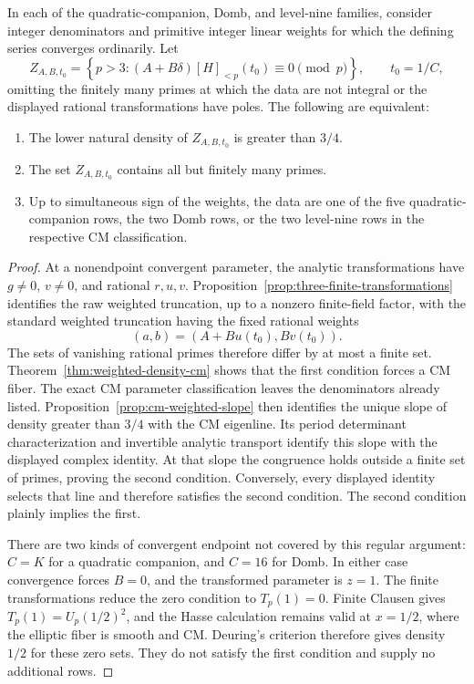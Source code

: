 \begin{theorem}
\label{thm:additional-raw-density}
In each of the quadratic-companion, Domb, and level-nine families,
consider integer denominators and primitive integer linear weights
for which the defining series converges ordinarily.  Let
\[
 Z_{A,B,t_0}=
 \left\{p>3:(A+B\delta)[H]_{<p}(t_0)\equiv0\pmod p\right\},
 \qquad t_0=1/C,
\]
omitting the finitely many primes at which the data are not integral
or the displayed rational transformations have poles.  The following
are equivalent:
\begin{enumerate}
\item The lower natural density of $Z_{A,B,t_0}$ is greater than $3/4$.
\item The set $Z_{A,B,t_0}$ contains all but finitely many primes.
\item Up to simultaneous sign of the weights, the data are one of the
five quadratic-companion rows, the two Domb rows, or the two level-nine
rows in the respective CM classification.
\end{enumerate}
\end{theorem}
\begin{proof}
At a nonendpoint convergent parameter, the analytic transformations
have $g\ne0$, $v\ne0$, and rational $r,u,v$.
Proposition~\ref{prop:three-finite-transformations} identifies the
raw weighted truncation, up to a nonzero finite-field factor, with
the standard weighted truncation having the fixed rational weights
\[
 (a,b)=(A+Bu(t_0),Bv(t_0)).
\]
The sets of vanishing rational primes therefore differ by at most
a finite set.  Theorem~\ref{thm:weighted-density-cm} shows that the
first condition forces a CM fiber.  The exact CM parameter
classification leaves the denominators already listed.
Proposition~\ref{prop:cm-weighted-slope} then identifies the unique
slope of density greater than $3/4$ with the CM eigenline.  Its period
determinant characterization and invertible analytic transport
identify this slope with the displayed complex identity.  At that
slope the congruence holds outside a finite set of primes, proving
the second condition.  Conversely, every displayed identity selects
that line and therefore satisfies the second condition.  The second
condition plainly implies the first.

There are two kinds of convergent endpoint not covered by this
regular argument: $C=K$ for a quadratic companion, and $C=16$ for
Domb.  In either case convergence forces $B=0$, and the transformed
parameter is $z=1$.  The finite transformations reduce the zero
condition to $T_p(1)=0$.  Finite Clausen gives
$T_p(1)=U_p(1/2)^2$, and the Hasse calculation remains valid at
$x=1/2$, where the elliptic fiber is smooth and CM.  Deuring's
criterion therefore gives density $1/2$ for these zero sets.  They
do not satisfy the first condition and supply no additional rows.
\end{proof}

